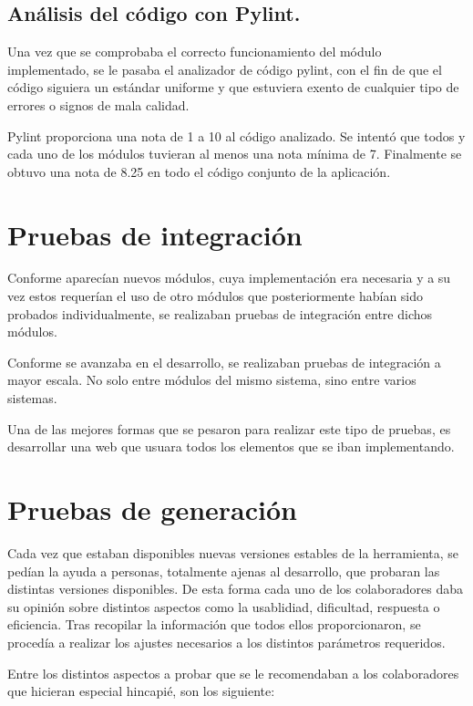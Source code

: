 \subsection{Análisis del código con Pylint.}

Una vez que se comprobaba el correcto funcionamiento del módulo implementado, se le pasaba el analizador de código pylint, con el
fin de que el código siguiera un estándar uniforme y que estuviera exento de cualquier tipo de errores o signos de mala calidad.

Pylint proporciona una nota de 1 a 10 al código analizado. Se intentó que todos y cada uno de los módulos tuvieran al menos
una nota mínima de 7. Finalmente se obtuvo una nota de 8.25 en todo el código conjunto de la aplicación.

\section{Pruebas de integración}

Conforme aparecían nuevos módulos, cuya implementación era necesaria y a su vez estos requerían el uso de otro módulos que
posteriormente habían sido probados individualmente, se realizaban pruebas de integración entre dichos módulos.

Conforme se avanzaba en el desarrollo, se realizaban pruebas de integración a mayor escala. No solo entre módulos
del mismo sistema, sino entre varios sistemas.

Una de las mejores formas que se pesaron para realizar este tipo de pruebas, es desarrollar una web que usuara todos los elementos
que se iban implementando.

\section{Pruebas de generación}

Cada vez que estaban disponibles nuevas versiones estables de la herramienta, se pedían la ayuda a personas,
totalmente ajenas al desarrollo, que probaran las distintas versiones disponibles. De esta forma cada uno 
de los colaboradores daba su opinión sobre  distintos aspectos como la usablidiad, dificultad, respuesta o eficiencia. 
Tras recopilar la información que todos ellos proporcionaron, se procedía a realizar los ajustes
necesarios a los distintos parámetros requeridos.

Entre los distintos aspectos a probar que se le recomendaban a los
colaboradores que hicieran especial hincapié, son los siguiente:

